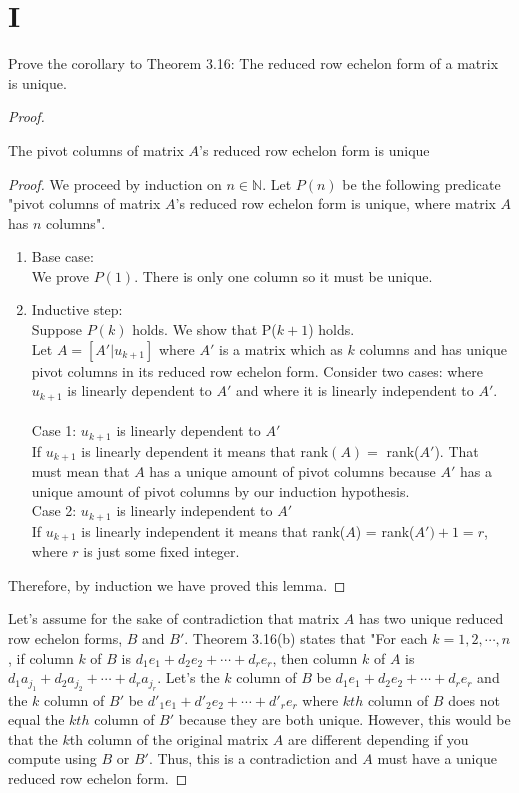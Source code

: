 \documentclass[11pt]{scrartcl}
\begin{document}
\section{I} 
Prove the corollary to Theorem 3.16: The reduced row echelon form of a matrix is unique.
\begin{proof}
	\begin{lemma}
		The pivot columns of matrix $A$'s reduced row echelon form is unique
		\begin{proof}
			We proceed by induction on $n \in \mathbb{N}$. Let $P(n)$ be the following predicate 
			"pivot columns of matrix $A$'s reduced row echelon form is unique, where matrix $A$ has $n$ columns".
			\begin{enumerate}[label=\alph*.]
				\item{
					Base case:\\
					We prove $P(1)$.
					There is only one column so it must be unique.
				}
				\item{
					Inductive step:\\
					Suppose $P(k)$ holds. 
					We show that P($k+1$) holds.\\
					Let $A = [A'|u_{k+1}]$ where $A'$ is a matrix which as $k$ columns and has unique pivot columns in its reduced row echelon form.
					Consider two cases: where $u_{k+1}$ is linearly dependent to $A'$ and where it is linearly independent to $A'$.\\\-\\
					Case 1: $u_{k+1}$ is linearly dependent to $A'$\\
					If $u_{k+1}$ is linearly dependent it means that rank$(A) = $ rank($A'$). That must mean that $A$ has a unique amount of pivot columns because $A'$
					has a unique amount of pivot columns by our induction hypothesis.\-\\
	
					Case 2: $u_{k+1}$ is linearly independent to $A'$\\
					If $u_{k+1}$ is linearly independent it means that rank($A$) = rank($A') + 1 = r$, where $r$ is just some fixed integer. 
				}
			\end{enumerate}
			Therefore, by induction we have proved this lemma.
			\end{proof}
	\end{lemma}

Let's assume for the sake of contradiction that matrix $A$ has two unique reduced row echelon forms, $B$ and $B'$.
Theorem 3.16(b) states that "For each $k = 1, 2, \cdots, n$, if column $k$ of $B$ is $d_1e_1 + d_2e_2 + \cdots + d_re_r $, 
then column $k$ of $A$ is $d_1a_{j_1} + d_2a_{j_2} + \cdots + d_ra_{j_r}$. Let's the $k$ column of $B$ be $d_1e_1 + d_2e_2 + \cdots + d_re_r$
and the $k$ column of $B'$ be $d'_1e_1 + d'_2e_2 + \cdots + d'_re_r$ where $kth$ column of $B$ does not equal the $kth$ column of $B'$ because they are both unique.
However, this would be that the $k$th column of the original matrix $A$ are different depending if you compute using $B$ or $B'$. Thus, this is a contradiction
and $A$ must have a unique reduced row echelon form. 
\end{proof}
\end{document}
